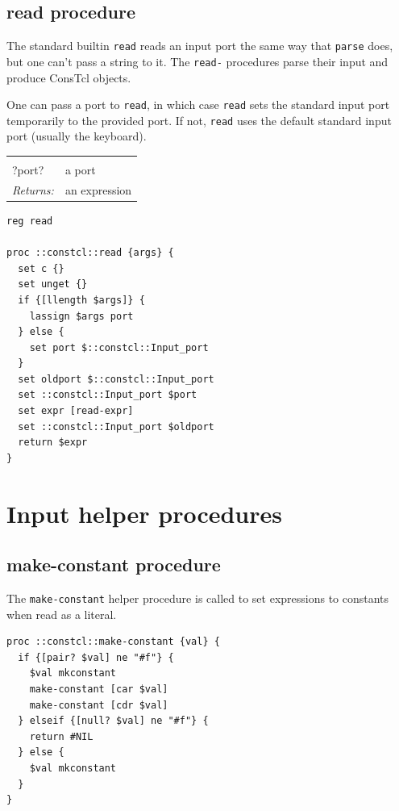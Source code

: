 \documentclass[twoside,9pt]{report}
\begin{document}
\subsection{read procedure}
\label{read-procedure}


The standard builtin \texttt{read} reads an input port the same way that \texttt{parse} does, but one can't pass a string to it. The \texttt{read-} procedures parse their input and produce ConsTcl objects.


One can pass a port to \texttt{read}, in which case \texttt{read} sets the standard input port temporarily to the provided port. If not, \texttt{read} uses the default standard input port (usually the keyboard).

\noindent\begin{tabular}{ |p{1.5cm} p{8cm}| }
\hline
\rowcolor[HTML]{CCCCCC} \multicolumn{2}{|l|}{\bf read (public)} \\
?port? & a port \\
\textit{Returns:} & an expression \\
\hline
\end{tabular}
\begin{lstlisting}
reg read
 
proc ::constcl::read {args} {
  set c {}
  set unget {}
  if {[llength $args]} {
    lassign $args port
  } else {
    set port $::constcl::Input_port
  }
  set oldport $::constcl::Input_port
  set ::constcl::Input_port $port
  set expr [read-expr]
  set ::constcl::Input_port $oldport
  return $expr
}
\end{lstlisting}
\section{Input helper procedures}
\label{input-helper-procedures}
\subsection{make-constant procedure}
\label{make-constant-procedure}


The \texttt{make-constant} helper procedure is called to set expressions to constants when read as a literal.

\begin{lstlisting}
proc ::constcl::make-constant {val} {
  if {[pair? $val] ne "#f"} {
    $val mkconstant
    make-constant [car $val]
    make-constant [cdr $val]
  } elseif {[null? $val] ne "#f"} {
    return #NIL
  } else {
    $val mkconstant
  }
}
\end{lstlisting}
\end{document}

